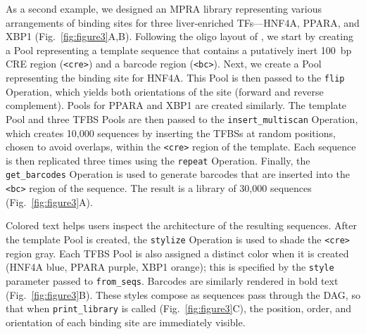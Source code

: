 \documentclass[twoside]{kinney_lab_preprintstyle}
\begin{document}
As a second example, we designed an MPRA library representing various arrangements of binding sites for three liver-enriched TFs---HNF4A, PPARA, and XBP1 (Fig.~\ref{fig:figure3}A,B). Following the oligo layout of \citet{Melnikov2012dw}, we start by creating a Pool representing a template sequence that contains a putatively inert 100~bp CRE region (\texttt{<cre>}) and a barcode region (\texttt{<bc>}). Next, we create a Pool representing the binding site for HNF4A. This Pool is then passed to the \texttt{flip} Operation, which yields both orientations of the site (forward and reverse complement). Pools for PPARA and XBP1 are created similarly. The template Pool and three TFBS Pools are then passed to the \texttt{insert\_multiscan} Operation, which creates 10,000 sequences by inserting the TFBSs at random positions, chosen to avoid overlaps, within the \texttt{<cre>} region of the template. Each sequence is then replicated three times using the \texttt{repeat} Operation. Finally, the \texttt{get\_barcodes} Operation is used to generate barcodes that are inserted into the \texttt{<bc>} region of the sequence. The result is a library of 30,000 sequences (Fig.~\ref{fig:figure3}A). 

Colored text helps users inspect the architecture of the resulting sequences. After the template Pool is created, the \texttt{stylize} Operation is used to shade the \texttt{<cre>} region gray. Each TFBS Pool is also assigned a distinct color when it is created (HNF4A blue, PPARA purple, XBP1 orange); this is specified by the \texttt{style} parameter passed to \texttt{from\_seqs}. Barcodes are similarly rendered in bold text (Fig.~\ref{fig:figure3}B). These styles compose as sequences pass through the DAG, so that when \texttt{print\_library} is called (Fig.~\ref{fig:figure3}C), the position, order, and orientation of each binding site are immediately visible.
\end{document}
